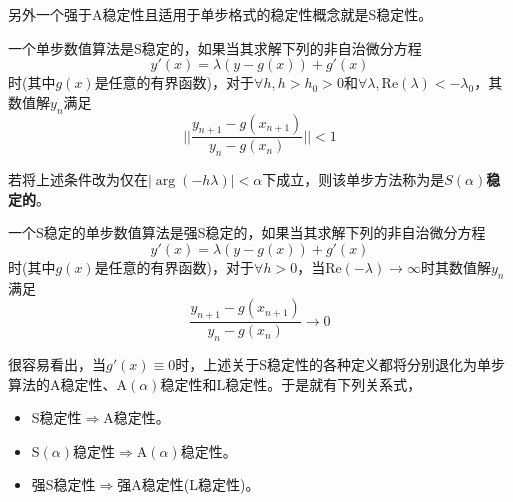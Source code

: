 另外一个强于A稳定性且适用于单步格式的稳定性概念就是S稳定性\cite{Prothero1974}。
\begin{definition}[S稳定性]
一个单步数值算法是S稳定的\cite{Prothero1974,Fatunla1988}，如果当其求解下列的非自治微分方程
\begin{equation}
y'(x)=\lambda(y-g(x))+g'(x)
\end{equation}
时(其中$g(x)$是任意的有界函数)，对于$\forall h,h>h_0>0$和$\forall\lambda, \text{Re}(\lambda)<-\lambda_0$，其数值解$y_n$满足
\begin{equation}
||\frac{y_{n+1}-g(x_{n+1})}{y_n-g(x_n)}||<1
\end{equation}
\end{definition}
若将上述条件改为仅在$|\arg(-h\lambda)|<\alpha$下成立，则该单步方法称为是$S(\alpha)$\textbf{稳定的}\cite{Prothero1974}。
\begin{definition}[强S稳定性]
一个S稳定的单步数值算法是强S稳定的\cite{Prothero1974}，如果当其求解下列的非自治微分方程
\begin{equation}
y'(x)=\lambda(y-g(x))+g'(x)
\end{equation}
时(其中$g(x)$是任意的有界函数)，对于$\forall h>0$，当$\text{Re}(-\lambda)\to\infty$时其数值解$y_n$满足
\begin{equation}
\frac{y_{n+1}-g(x_{n+1})}{y_n-g(x_n)}\to0
\end{equation}
\end{definition}
很容易看出，当$g'(x)\equiv0$时，上述关于S稳定性的各种定义都将分别退化为单步算法的A稳定性、A$(\alpha)$稳定性和L稳定性。于是就有下列关系式，
\begin{itemize}
\item[\ddag] S稳定性$\Longrightarrow$A稳定性。
\item[\ddag] S$(\alpha)$稳定性$\Longrightarrow$A$(\alpha)$稳定性。
\item[\ddag] 强S稳定性$\Longrightarrow$强A稳定性(L稳定性)。
\end{itemize}

